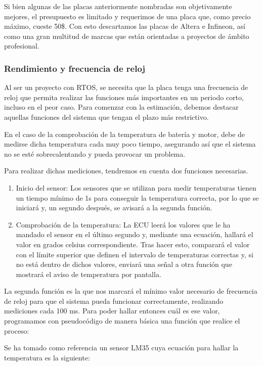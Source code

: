 Si bien algunas de las placas anteriormente nombradas son objetivamente mejores, el presupuesto es limitado y requerimos de una placa que, como precio máximo, cueste 50\$. Con esto descartamos las placas de Altera e Infineon, así como una gran multitud de marcas que están orientadas a proyectos de ámbito profesional. 

\subsubsection{Rendimiento y frecuencia de reloj}

Al ser un proyecto con RTOS, se necesita que la placa tenga una frecuencia de reloj que permita realizar las funciones más importantes en un periodo corto, incluso en el peor caso. Para comenzar con la estimación, debemos destacar aquellas funciones del sistema que tengan el plazo más restrictivo. 

En el caso de la comprobación de la temperatura de batería y motor, debe de medirse dicha temperatura cada muy poco tiempo, asegurando así que el sistema no se esté sobrecalentando y pueda provocar un problema. 

Para realizar dichas mediciones, tendremos en cuenta dos funciones necesarias. 

\begin{enumerate}
    \item Inicio del sensor: Los sensores que se utilizan para medir temperaturas tienen un tiempo mínimo de 1s para conseguir la temperatura correcta, por lo que se iniciará y, un segundo después, se avisará a la segunda función.
    \item Comprobación de la temperatura: La ECU leerá los valores que le ha mandado el sensor en el último segundo y, mediante una ecuación, hallará el valor en grados celsius correspondiente. Tras hacer esto, comparará el valor con el límite superior que definen el intervalo de temperaturas correctas y, si no está dentro de dichos valores, enviará una señal a otra función que mostrará el aviso de temperatura por pantalla. 
\end{enumerate}

La segunda función es la que nos marcará el mínimo valor necesario de frecuencia de reloj para que el sistema pueda funcionar correctamente, realizando mediciones cada 100 ms. Para poder hallar entonces cuál es ese valor, programamos con pseudocódigo de manera básica una función que realice el proceso:


Se ha tomado como referencia un sensor LM35 cuya ecuación para hallar la temperatura es la siguiente: 

